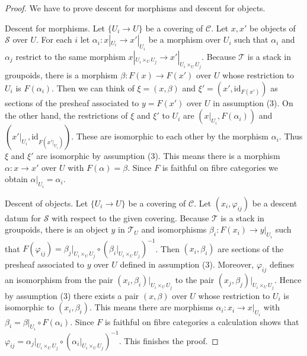 \begin{proof}
We have to prove descent for morphisms and descent for objects.

\medskip\noindent
Descent for morphisms. Let $\{U_i \to U\}$ be a covering of $\mathcal{C}$.
Let $x, x'$ be objects of $\mathcal{S}$ over $U$. For each $i$
let $\alpha_i : x|_{U_i} \to x'|_{U_i}$ be a morphism over $U_i$
such that $\alpha_i$ and $\alpha_j$ restrict to the same morphism
$x|_{U_i \times_U U_j} \to x'|_{U_i \times_U U_j}$.
Because $\mathcal{T}$ is a stack in groupoids, there is a morphism
$\beta : F(x) \to F(x')$ over $U$ whose restriction to $U_i$ is $F(\alpha_i)$.
Then we can think of $\xi = (x, \beta)$ and $\xi' = (x', \text{id}_{F(x')})$
as sections of the presheaf associated to $y = F(x')$ over $U$
in assumption (3). On the other hand, the restrictions of
$\xi$ and $\xi'$ to $U_i$ are $(x|_{U_i}, F(\alpha_i))$
and $(x'|_{U_i}, \text{id}_{F(x'|_{U_i})})$.
These are isomorphic to each other by the morphism $\alpha_i$.
Thus $\xi$ and $\xi'$ are isomorphic by assumption (3). This means there is a
morphism $\alpha : x \to x'$ over $U$ with $F(\alpha) = \beta$.
Since $F$ is faithful on fibre categories we obtain
$\alpha|_{U_i} = \alpha_i$.

\medskip\noindent
Descent of objects. Let $\{U_i \to U\}$ be a covering of $\mathcal{C}$.
Let $(x_i, \varphi_{ij})$ be a descent datum for $\mathcal{S}$ with
respect to the given covering. Because $\mathcal{T}$ is a stack in groupoids,
there is an object $y$ in $\mathcal{T}_U$ and isomorphisms
$\beta_i : F(x_i) \to y|_{U_i}$ such that
$F(\varphi_{ij}) = \beta_j|_{U_i \times_U U_j} \circ
(\beta_i|_{U_i \times_U U_j})^{-1}$.
Then $(x_i, \beta_i)$ are sections of the presheaf associated to
$y$ over $U$ defined in assumption (3).
Moreover, $\varphi_{ij}$ defines an isomorphism
from the pair $(x_i, \beta_i)|_{U_i \times_U U_j}$ to 
the pair $(x_j, \beta_j)|_{U_i \times_U U_j}$.
Hence by assumption (3) there exists a pair $(x, \beta)$ over $U$
whose restriction to $U_i$ is isomorphic to $(x_i, \beta_i)$.
This means there are morphisms $\alpha_i : x_i \to x|_{U_i}$
with $\beta_i = \beta|_{U_i} \circ F(\alpha_i)$.
Since $F$ is faithful on fibre categories a calculation shows
that $\varphi_{ij} = \alpha_j|_{U_i \times_U U_j} \circ
(\alpha_i|_{U_i \times_U U_j})^{-1}$. This finishes the proof.
\end{proof}










